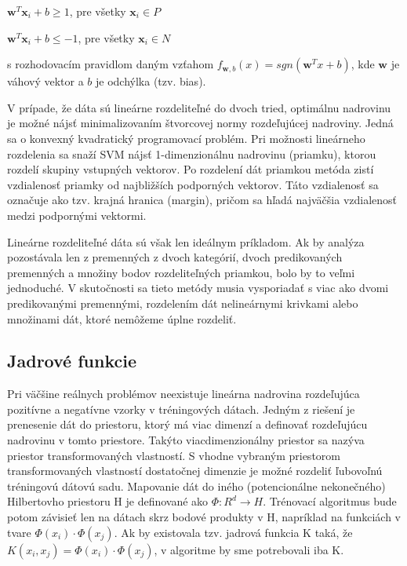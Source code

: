 	$\textbf{w}^{T}\textbf{x}_{i} + b \geq 1$, pre všetky $\textbf{x}_{i} \in P$
	
    $\textbf{w}^{T}\textbf{x}_{i} + b \leq -1$, pre všetky $\textbf{x}_{i} \in N$
    
s rozhodovacím pravidlom daným vzťahom $f_{\textbf{w},b} ( x ) = sgn(\textbf{w}^{T}x + b )$, kde $\textbf{w}$ je váhový vektor a $b$ je odchýlka (tzv. bias).

V prípade, že dáta sú lineárne rozdeliteľné do dvoch tried, optimálnu nadrovinu je možné nájsť minimalizovaním štvorcovej normy rozdeľujúcej nadroviny. Jedná sa o konvexný kvadratický programovací problém.
Pri možnosti lineárneho rozdelenia sa snaží SVM nájsť 1-dimenzionálnu nadrovinu (priamku), ktorou rozdelí skupiny vstupných vektorov. Po rozdelení dát priamkou metóda zistí vzdialenosť priamky od najbližších podporných vektorov. Táto vzdialenosť sa označuje ako tzv. krajná hranica (margin), pričom sa hľadá najväčšia vzdialenosť medzi podpornými vektormi.  

Lineárne rozdeliteľné dáta sú však len ideálnym príkladom. Ak by analýza pozostávala len z premenných z dvoch kategórií, dvoch predikovaných premenných a množiny bodov rozdeliteľných priamkou, bolo by to veľmi jednoduché. V skutočnosti sa tieto metódy musia vysporiadať s viac ako dvomi predikovanými premennými, rozdelením dát nelineárnymi krivkami alebo množinami dát, ktoré nemôžeme úplne rozdeliť. 

\subsection{Jadrové funkcie}

Pri väčšine reálnych problémov neexistuje lineárna nadrovina rozdeľujúca pozitívne a negatívne vzorky v tréningových dátach. Jedným z riešení je prenesenie dát do priestoru, ktorý má viac dimenzí a definovať rozdeľujúcu nadrovinu v tomto priestore. Takýto viacdimenzionálny priestor sa nazýva priestor transformovaných vlastností. S vhodne vybraným priestorom transformovaných vlastností dostatočnej dimenzie je možné rozdeliť ľubovoľnú tréningovú dátovú sadu.
Mapovanie dát do iného (potencionálne nekonečného) Hilbertovho priestoru H je definované ako $\Phi:R^{d} \rightarrow H$. Trénovací algoritmus bude potom závisieť len na dátach skrz bodové produkty v H, napríklad na funkciách v tvare $\Phi(x_{i})\cdot\Phi(x_{j})$. Ak by existovala tzv. jadrová funkcia K taká, že $K(x_{i},x_{j}) = \Phi(x_{i})\cdot\Phi(x_{j})$, v algoritme by sme potrebovali iba K. 

